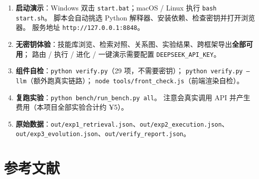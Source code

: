 \documentclass[UTF8, fontset=windows, 11pt, a4paper]{ctexart}
\begin{document}
\begin{enumerate}
\item \textbf{启动演示}：Windows 双击 \texttt{start.bat}；macOS / Linux 执行 \texttt{bash start.sh}。
      脚本会自动挑选 Python 解释器、安装依赖、检查密钥并打开浏览器。
      服务地址 \texttt{http://127.0.0.1:8848}。
\item \textbf{无密钥体验}：技能库浏览、检索对照、关系图、实验结果、跨框架导出\textbf{全部可用}；
      路由 / 执行 / 进化 / 一键演示需要配置 \texttt{DEEPSEEK\_API\_KEY}。
\item \textbf{组件自检}：\texttt{python verify.py}（29 项，不需要密钥）；
      \texttt{python verify.py --llm}（额外跑真实链路）；
      \texttt{node tools/front\_check.js}（前端渲染自检）。
\item \textbf{复跑实验}：\texttt{python bench/run\_bench.py all}。
      注意会真实调用 API 并产生费用（本项目全部实验合计约 ¥5）。
\item \textbf{原始数据}：\texttt{out/exp1\_retrieval.json}、\texttt{out/exp2\_execution.json}、
      \texttt{out/exp3\_evolution.json}、\texttt{out/verify\_report.json}。
\end{enumerate}

\section{参考文献}
\end{document}
